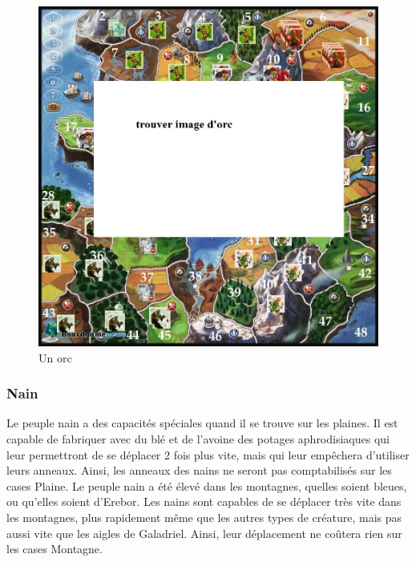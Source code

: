 \begin{figure}[!h]
\centering
\includegraphics[scale=0.10]{img/orc.jpg}
\caption{Un orc}
\end{figure}

\subsubsection{Nain}
Le peuple nain a des capacités spéciales quand il se trouve sur les plaines. Il est capable de fabriquer avec du blé et de l'avoine des potages aphrodisiaques qui leur permettront de se déplacer 2 fois plus vite, mais qui leur empêchera d'utiliser leurs anneaux.
\newline
 Ainsi, les anneaux des nains ne seront pas comptabilisés sur les cases Plaine.
\newline
\newline
Le peuple nain a été élevé dans les montagnes, quelles soient bleues, ou qu'elles soient d'Erebor. Les nains sont capables de se déplacer très vite dans les montagnes, plus rapidement même que les autres types de créature, mais pas aussi vite que les aigles de Galadriel.
\newline Ainsi, leur déplacement ne coûtera rien sur les cases Montagne.

